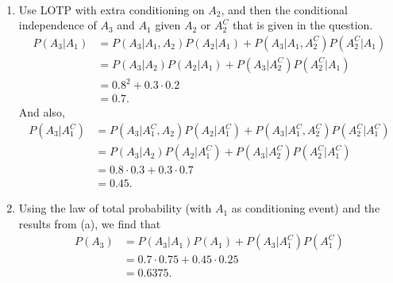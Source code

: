 

\setcounter{theorem}{9}
\begin{exercise}[BH.2.10]
\begin{solution}~
	\begin{enumerate}
		\item Use LOTP with extra conditioning on $A_{2}$, and then the conditional independence of $A_{3}$ and $A_{1}$ given $A_{2}$ or $A_{2}^{C}$ that is given in the question.
		\begin{align*}
			P(A_{3}|A_{1}) &= P(A_{3}|A_{1},A_{2})P(A_{2}|A_{1}) + P(A_{3}|A_{1},A_{2}^{C})P(A_{2}^{C}|A_{1})\\
			&= P(A_{3}|A_{2})P(A_{2}|A_{1}) + P(A_{3}|A_{2}^{C})P(A_{2}^{C}|A_{1})\\
			&= 0.8^2 + 0.3\cdot 0.2\\
			& = 0.7.
		\end{align*}
		And also,
		\begin{align*}
			P(A_{3}|A_{1}^{C}) &= P(A_{3}|A_{1}^{C},A_{2})P(A_{2}|A_{1}^{C}) + P(A_{3}|A_{1}^{C},A_{2}^{C})P(A_{2}^{C}|A_{1}^{C})\\
			&= P(A_{3}|A_{2})P(A_{2}|A_{1}^{C}) + P(A_{3}|A_{2}^{C})P(A_{2}^{C}|A_{1}^{C})\\
			&= 0.8 \cdot 0.3 + 0.3\cdot 0.7\\
			& = 0.45.
		\end{align*}
		\item  Using the law of total probability (with $A_{1}$ as conditioning event) and the results from (a), we find that
		\begin{align*}
			P(A_{3}) &= P(A_{3}|A_{1})P(A_{1}) +P(A_{3}|A_{1}^{C})P(A_{1}^{C})\\
			& = 0.7\cdot 0.75 + 0.45\cdot 0.25\\
			& = 0.6375.
		\end{align*}
	\end{enumerate}
\end{solution}
\end{exercise}


